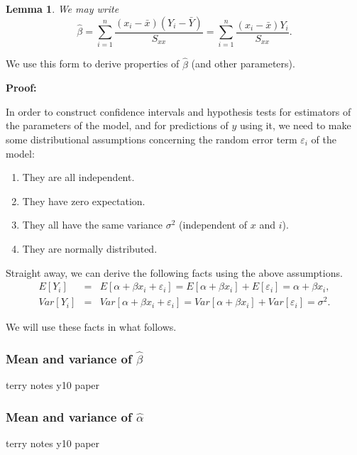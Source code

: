 \documentclass[12pt]{article}
\newtheorem{lemma}[theorem]{Lemma}
\begin{document}
\begin{lemma}
  We may write
  $$
  \hat{\beta}=\sum_{i=1}^{n}\frac{(x_{i}-\bar{x})(Y_{i}-\bar{Y})}{S_{xx}}=\sum_{i=1}^{n}\frac{(x_{i}-\bar{x})Y_{i}}{S_{xx}}.
  $$
\end{lemma}
We use this form to derive properties of $\hat{\beta}$ (and other parameters).

\begin{mdframed}
{\bf Proof:}
\textcolor[rgb]{1.00,1.00,1.00}{\lipsum[1-3]}
\end{mdframed}

In order to construct confidence intervals and hypothesis tests for estimators of the parameters of the model, and for predictions of $y$ using it, we need to make some distributional assumptions concerning the random error term $\varepsilon_{i}$ of the model:
\begin{enumerate}
\item They are all independent.
\item They have zero expectation.
\item They all have the same variance $\sigma^{2}$ (independent of $x$ and $i$).
\item They are normally distributed.
\end{enumerate}

Straight away, we can derive the following facts using the above assumptions.
\begin{eqnarray*}
  E[Y_{i}] &=& E[\alpha+\beta x_{i} +\varepsilon_{i}]=E[\alpha+\beta x_{i}] +E[\varepsilon_{i}]=\alpha+\beta x_{i}, \\
   Var[Y_{i}] &=& Var[\alpha+\beta x_{i} +\varepsilon_{i}]=Var[\alpha+\beta x_{i}] +Var[\varepsilon_{i}]=\sigma^{2}.
\end{eqnarray*}


We will use these facts in what follows.
\newpage
\subsubsection{Mean and variance of $\hat{\beta}$}

\begin{mdframed}
\textcolor[rgb]{1.00,1.00,1.00}{terry notes y10 paper\lipsum[1-4]}
\end{mdframed}

\subsubsection{Mean and variance of $\hat{\alpha}$}
\begin{mdframed}
\textcolor[rgb]{1.00,1.00,1.00}{terry notes y10 paper\lipsum[1-4]}
\end{mdframed}
\end{document}

